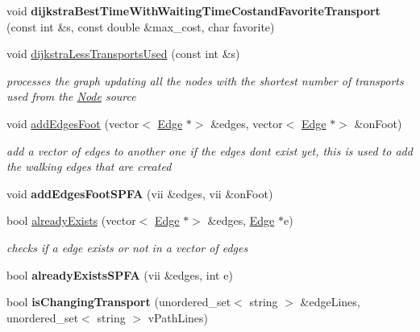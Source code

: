 \begin{DoxyCompactItemize}
\item 
\mbox{\label{class_graph_ab5d1ba036189b0007c48aad9725e6d05}} 
void {\bfseries dijkstra\+Best\+Time\+With\+Waiting\+Time\+Costand\+Favorite\+Transport} (const int \&s, const double \&max\+\_\+cost, char favorite)
\item 
void \hyperlink{class_graph_a747e004c927e230f380d58a399ce9e72}{dijkstra\+Less\+Transports\+Used} (const int \&s)
\begin{DoxyCompactList}\small\item\em processes the graph updating all the nodes with the shortest number of transports used from the \hyperlink{class_node}{Node} source \end{DoxyCompactList}\item 
void \hyperlink{class_graph_a35ecca558e2ec589407bc00c28f8542a}{add\+Edges\+Foot} (vector$<$ \hyperlink{class_edge}{Edge} $\ast$$>$ \&edges, vector$<$ \hyperlink{class_edge}{Edge} $\ast$$>$ \&on\+Foot)
\begin{DoxyCompactList}\small\item\em add a vector of edges to another one if the edges dont exist yet, this is used to add the walking edges that are created \end{DoxyCompactList}\item 
\mbox{\label{class_graph_a2db1cad9dd498ec17243351ef02ea591}} 
void {\bfseries add\+Edges\+Foot\+S\+P\+FA} (vii \&edges, vii \&on\+Foot)
\item 
bool \hyperlink{class_graph_ac2c3047c6f7bd231ad43368b60426b82}{already\+Exists} (vector$<$ \hyperlink{class_edge}{Edge} $\ast$$>$ \&edges, \hyperlink{class_edge}{Edge} $\ast$e)
\begin{DoxyCompactList}\small\item\em checks if a edge exists or not in a vector of edges \end{DoxyCompactList}\item 
\mbox{\label{class_graph_aa164ff7b6c2ae11808f67b40f6d9db35}} 
bool {\bfseries already\+Exists\+S\+P\+FA} (vii \&edges, int e)
\item 
\mbox{\label{class_graph_a5d63f8f19e570b084cffa12cd57d1bc4}} 
bool {\bfseries is\+Changing\+Transport} (unordered\+\_\+set$<$ string $>$ \&edge\+Lines, unordered\+\_\+set$<$ string $>$ v\+Path\+Lines)
\item 
$$
\end{DoxyCompactItemize}
